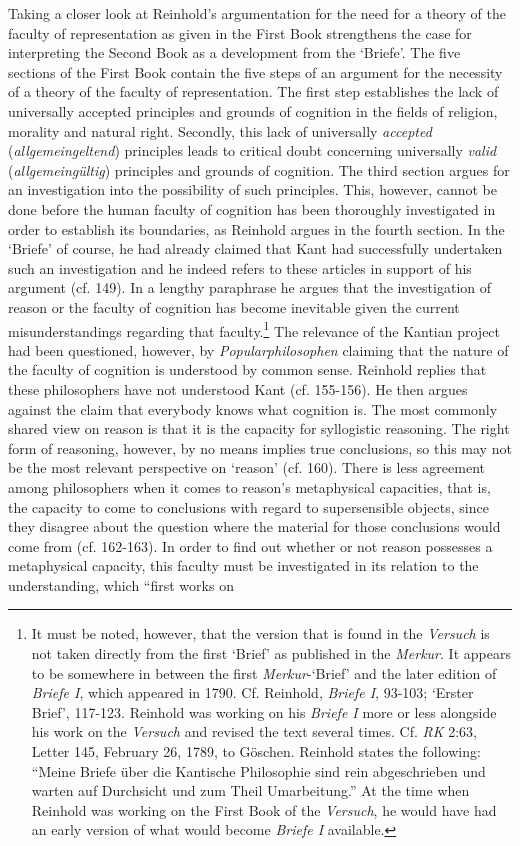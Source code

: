  Taking a closer look at Reinhold's argumentation for the need for a theory of the faculty of representation as given in the First Book strengthens the case for interpreting the Second Book as a development from the `Briefe'. The five sections of the First Book contain the five steps of an argument for the necessity of a theory of the faculty of representation. The first step establishes the lack of universally accepted principles and grounds of cognition in the fields of religion, morality and natural right. Secondly, this lack of universally \textit{accepted} (\textit{allgemeingeltend}) principles leads to critical doubt concerning universally \textit{valid} (\textit{allgemeing\"{u}ltig}) principles and grounds of cognition. The third section argues for an investigation into the possibility of such principles. This, however, cannot be done before the human faculty of cognition has been thoroughly investigated in order to establish its boundaries, as Reinhold argues in the fourth section. In the `Briefe' of course, he had already claimed that Kant had successfully undertaken such an investigation and he indeed refers to these articles in support of his argument (cf. 149). In a lengthy paraphrase he argues that the investigation of reason or the faculty of cognition has become inevitable given the current misunderstandings regarding that faculty.\footnote{ It must be noted, however, that the version that is found in the \textit{Versuch} is not taken directly from the first `Brief' as published in the \textit{Merkur}. It appears to be somewhere in between the first \textit{Merkur}{-}`Brief' and the later edition of \textit{Briefe I}, which appeared in 1790. Cf. Reinhold, \textit{Briefe I}, 93{-}103; `Erster Brief', 117{-}123. Reinhold was working on his \textit{Briefe I }more or less alongside his work on the \textit{Versuch} and revised the text several times. Cf. \textit{RK} 2:63, Letter 145, February 26, 1789, to G\"{o}schen. Reinhold states the following: ``Meine Briefe \"{u}ber die Kantische Philosophie sind rein abgeschrieben und warten auf Durchsicht und zum Theil Umarbeitung.'' At the time when Reinhold was working on the First Book of the \textit{Versuch}, he would have had an early version of what would become \textit{Briefe I} available. } The relevance of the Kantian project had been questioned, however, by \textit{Popularphilosophen} claiming that the nature of the faculty of cognition is understood by common sense. Reinhold replies that these philosophers have not understood Kant (cf. 155{-}156). He then argues against the claim that everybody knows what cognition is. The most commonly shared view on reason is that it is the capacity for syllogistic reasoning. The right form of reasoning, however, by no means implies true conclusions, so this may not be the most relevant perspective on `reason' (cf. 160). There is less agreement among philosophers when it comes to reason's metaphysical capacities, that is, the capacity to come to conclusions with regard to supersensible objects, since they disagree about the question where the material for those conclusions would come from (cf. 162{-}163). In order to find out whether or not reason possesses a metaphysical capacity, this faculty must be investigated in its relation to the understanding, which ``first works on 